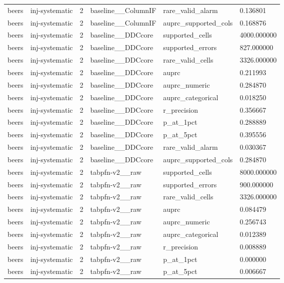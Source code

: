 \begin{tabular}{llllll}
beers & inj-systematic & 2 & baseline\_\_ColumnIF & rare\_valid\_alarm & 0.136801 \\
beers & inj-systematic & 2 & baseline\_\_ColumnIF & auprc\_supported\_cols & 0.168876 \\
beers & inj-systematic & 2 & baseline\_\_DDCcore & supported\_cells & 4000.000000 \\
beers & inj-systematic & 2 & baseline\_\_DDCcore & supported\_errors & 827.000000 \\
beers & inj-systematic & 2 & baseline\_\_DDCcore & rare\_valid\_cells & 3326.000000 \\
beers & inj-systematic & 2 & baseline\_\_DDCcore & auprc & 0.211993 \\
beers & inj-systematic & 2 & baseline\_\_DDCcore & auprc\_numeric & 0.284870 \\
beers & inj-systematic & 2 & baseline\_\_DDCcore & auprc\_categorical & 0.018250 \\
beers & inj-systematic & 2 & baseline\_\_DDCcore & r\_precision & 0.356667 \\
beers & inj-systematic & 2 & baseline\_\_DDCcore & p\_at\_1pct & 0.288889 \\
beers & inj-systematic & 2 & baseline\_\_DDCcore & p\_at\_5pct & 0.395556 \\
beers & inj-systematic & 2 & baseline\_\_DDCcore & rare\_valid\_alarm & 0.030367 \\
beers & inj-systematic & 2 & baseline\_\_DDCcore & auprc\_supported\_cols & 0.284870 \\
beers & inj-systematic & 2 & tabpfn-v2\_\_raw & supported\_cells & 8000.000000 \\
beers & inj-systematic & 2 & tabpfn-v2\_\_raw & supported\_errors & 900.000000 \\
beers & inj-systematic & 2 & tabpfn-v2\_\_raw & rare\_valid\_cells & 3326.000000 \\
beers & inj-systematic & 2 & tabpfn-v2\_\_raw & auprc & 0.084479 \\
beers & inj-systematic & 2 & tabpfn-v2\_\_raw & auprc\_numeric & 0.256743 \\
beers & inj-systematic & 2 & tabpfn-v2\_\_raw & auprc\_categorical & 0.012389 \\
beers & inj-systematic & 2 & tabpfn-v2\_\_raw & r\_precision & 0.008889 \\
beers & inj-systematic & 2 & tabpfn-v2\_\_raw & p\_at\_1pct & 0.000000 \\
beers & inj-systematic & 2 & tabpfn-v2\_\_raw & p\_at\_5pct & 0.006667 \\

\end{tabular}
